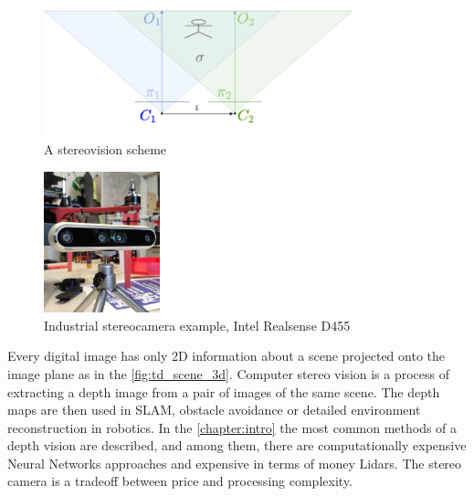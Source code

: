 \begin{figure}[h]
    \centering
    \includegraphics[width=0.8\textwidth]{graphics/stereopair.png}
    \caption{A stereovision scheme}
    \label{fig:sch_stereo}
\end{figure}
\begin{figure}[h]
    \centering
    \includegraphics[width=0.3\textwidth]{graphics/stereo_example.jpg}
    \caption{Industrial stereocamera example, Intel Realsense D455}
    \label{fig:stereo_ex}
\end{figure}


Every digital image has only 2D information about a scene projected onto the image plane as in the \autoref{fig:td_scene_3d}.
Computer stereo vision is a process of extracting a depth image from a pair of images of the same scene. 
The depth maps are then used in SLAM, obstacle avoidance or detailed environment reconstruction in robotics.
In the \autoref{chapter:intro} the most common methods of a depth vision are described, and among them, there are computationally expensive Neural Networks approaches and expensive in terms of money Lidars.
The stereo camera is a tradeoff between price and processing complexity.

